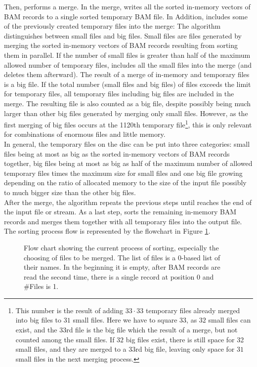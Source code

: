 Then, \sort performs a merge. In the merge, \sort writes all the sorted in-memory vectors of BAM records to a single sorted temporary BAM file. In Addition, \sort includes some of the previously created temporary files into the merge: The algorithm distinguishes between small files and big files. Small files are files generated by merging the sorted in-memory vectors of BAM records resulting from sorting them in parallel. If the number of small files is greater than half of the maximum allowed number of temporary files, \sort includes all the small files into the merge (and deletes them afterward). The result of a merge of in-memory and temporary files is a big file. If the total number (small files and big files) of files exceeds the limit for temporary files, all temporary files including big files are included in the merge. The resulting file is also counted as a big file, despite possibly being much larger than other big files generated by merging only small files. However, as the first merging of big files occurs at the 1120th temporary file\footnote{This number is the result of adding $33 \cdot 33$ temporary files already merged into big files to $31$ small files. Here we have to square $33$, as $32$ small files can exist, and the $33$rd file is the big file which the result of a merge, but not counted among the small files. If $32$ big files exist, there is still space for 32 small files, and they are merged to a $33$rd big file, leaving only space for $31$ small files in the next merging process.}, this is only relevant for combinations of enormous files and little memory. \\

In general, the temporary files on the disc can be put into three categories: small files being at most as big as the sorted in-memory vectors of BAM records together, big files being at most as big as half of the maximum number of allowed temporary files times the maximum size for small files and one big file growing depending on the ratio of allocated memory to the size of the input file possibly to much bigger size than the other big files. \\

After the merge, the algorithm repeats the previous steps until \sort reaches the end of the input file or stream. As a last step, \sort sorts the remaining in-memory BAM records and merges them together with all temporary files into the output file.
The sorting process flow is represented by the flowchart in Figure \ref{fig:flow}.

\begin{figure}[ht]
    \begin{adjustbox}{width=\linewidth}
        
    \end{adjustbox}
    \caption{Flow chart showing the current process of sorting, especially the choosing of files to be merged. The list of files is a 0-based list of their names. In the beginning it is empty, after BAM records are read the second time, there is a single record at position 0 and \#Files is 1.}
    \label{fig:flow}
\end{figure}